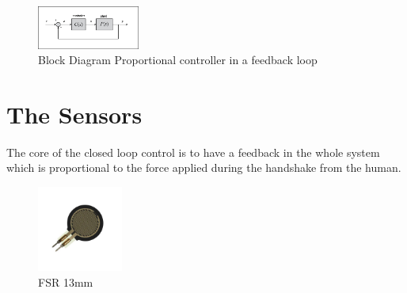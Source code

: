 \begin{figure}[h]
\centering
\includegraphics[width=0.3\textwidth]{Figure/feedbackP.png}
\caption{Block Diagram Proportional controller in a feedback loop}
\label{Fig:Pr}
\end{figure}


\section{The Sensors}
The core of the closed loop control is to have a feedback in the whole system which is proportional to the force applied during the handshake from the human. 
\begin{figure}
\centering
\includegraphics[width=0.25\textwidth]{Figure/fsrsingle1.jpg}
\caption{FSR 13mm}
\label{Fig:FSRsingle}
\end{figure}

